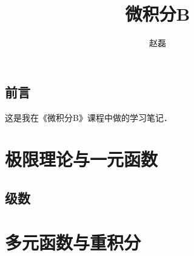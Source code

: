 \documentclass[a4paper,punct=CCT]{ctexbook}
\title{微积分B}
\author{赵磊}
\theoremstyle{definition}
\theoremstyle{remark}
\begin{document}
\nocite{*}
\frontmatter
{}
\maketitle
\thispagestyle{empty}

\chapter*{前言}

这是我在《微积分B》课程中做的学习笔记．

\clearpage
\thispagestyle{empty}

\mainmatter

\part{极限理论与一元函数}















\chapter{级数}


\backmatter

\part{多元函数与重积分}



\end{document}
